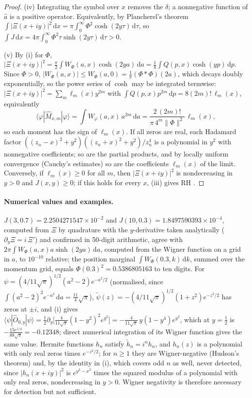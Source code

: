 \documentclass[11pt]{article}
\theoremstyle{definition}\newtheorem{definition}[theorem]{Definition}
\theoremstyle{remark}\newtheorem{remark}[theorem]{Remark}
\newcommand{\dd}{\,\mathrm d}\newcommand{\e}{\mathrm e}
\begin{document}
\begin{proof}
(iv) Integrating the symbol over $x$ removes the $\delta$; a nonnegative function of $\hat a$ is a positive operator. Equivalently, by Plancherel's theorem $\int|\Xi(x+iy)|^2\dd x=\pi\int_0^\infty\Phi^2\cosh(2y\tau)\dd\tau$, so $\int J\dd x=4\pi\int_0^\infty\Phi^2\tau\sinh(2y\tau)\dd\tau>0$.

(v) By (i) for $\Phi$, $|\Xi(x+iy)|^2=\frac\pi2\int W_\Phi(a,x)\cosh(2ya)\dd a=\frac18\int Q(p,x)\cosh(yp)\dd p$. Since $\Phi>0$, $|W_\Phi(a,x)|\le W_\Phi(a,0)=\frac1\pi(\Phi*\Phi)(2a)$, which decays doubly exponentially, so the power series of $\cosh$ may be integrated termwise: $|\Xi(x+iy)|^2=\sum_m\ell_m(x)y^{2m}$ with $\int Q(p,x)p^{2m}\dd p=8(2m)!\,\ell_m(x)$, equivalently
\[
\langle\varphi|\hat M_{x,m}|\varphi\rangle=\int W_\varphi(a,x)\,a^{2m}\dd a=\frac{2\,(2m)!}{\pi\,4^m\|\Phi\|^2}\,\ell_m(x),
\]
so each moment has the sign of $\ell_m(x)$. If all zeros are real, each Hadamard factor $((z_n-x)^2+y^2)((z_n+x)^2+y^2)/z_n^4$ is a polynomial in $y^2$ with nonnegative coefficients; so are the partial products, and by locally uniform convergence (Cauchy's estimates) so are the coefficients $\ell_m(x)$ of the limit. Conversely, if $\ell_m(x)\ge0$ for all $m$, then $|\Xi(x+iy)|^2$ is nondecreasing in $y>0$ and $J(x,y)\ge0$; if this holds for every $x$, (iii) gives RH \cite{Patrick,CV,SMath}.
\end{proof}

\paragraph{Numerical values and examples.} $J(3,0.7)=2.2504271547\times10^{-2}$ and $J(10,0.3)=1.8497590393\times10^{-4}$, computed from $\Xi$ by quadrature with the $y$-derivative taken analytically ($\partial_y\Xi=i\,\Xi'$) and confirmed in 50-digit arithmetic, agree with $2\pi\int W_\Phi(a,x)a\sinh(2ya)\dd a$, computed from the Wigner function on a grid in $a$, to $10^{-10}$ relative; the position marginal $\int W_\Phi(0.3,k)\dd k$, summed over the momentum grid, equals $\Phi(0.3)^2=0.5386805163$ to ten digits. For $\psi=(4/11\sqrt\pi)^{1/2}(a^2-2)e^{-a^2/2}$ (normalised, since $\int(a^2-2)^2e^{-a^2}\dd a=\frac{11}4\sqrt\pi$), $\tilde\psi(z)=-(4/11\sqrt\pi)^{1/2}(1+z^2)e^{-z^2/2}$ has zeros at $\pm i$, and (i) gives $\langle\psi|\hat O_{0,y}|\psi\rangle=\frac12\partial_y\bigl[\frac4{11\sqrt\pi}(1-y^2)^2e^{y^2}\bigr]=-\frac4{11\sqrt\pi}\,y(1-y^4)e^{y^2}$, which at $y=\frac12$ is $-\frac{15e^{1/4}}{88\sqrt\pi}=-0.12348$; direct numerical integration of its Wigner function gives the same value. Hermite functions $h_n$ satisfy $\tilde h_n=i^nh_n$, and $h_n(z)$ is a polynomial with only real zeros times $e^{-z^2/2}$; for $n\ge1$ they are Wigner-negative (Hudson's theorem) and, by the identity in (i), which covers odd $n$ as well, never detected, since $|h_n(x+iy)|^2$ is $e^{y^2-x^2}$ times the squared modulus of a polynomial with only real zeros, nondecreasing in $y>0$. Wigner negativity is therefore necessary for detection but not sufficient.
\end{document}
